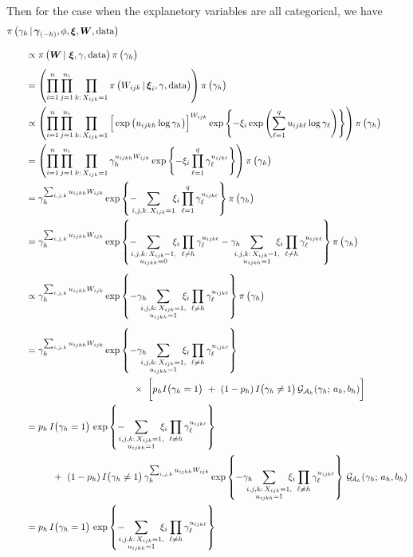 \documentclass[11pt]{article}
\renewcommand{\vec}{\boldsymbol}
\newcommand{\barS}{\,|\,}
\newcommand{\ind}{I}
\newcommand{\gammaExpr}{ -\hspace{3mm} \sum_{\mathclap{i,j,k{:}\, X_{ijk}=1}} \hspace{4mm} \xi_i \prod_{\ell=1}^q \gamma_\ell^{ u_{ijk\ell} } }
\newcommand{\gammaExprUisZero}{ \hspace{3mm} \sum_{\mathclap{\substack{i,j,k{:}\, X_{ijk}=1, \\ u_{ijkh} = 0}}} \hspace{4mm} \xi_i \prod_{\ell \ne h} \gamma_\ell^{ u_{ijk\ell} } }
\newcommand{\gammaExprUisOne}{ \hspace{3mm} \sum_{\mathclap{\substack{i,j,k{:}\, X_{ijk}=1, \\ u_{ijkh} = 1}}} \hspace{4mm} \xi_i \prod_{\ell \ne h} \gamma_\ell^{ u_{ijk\ell} } }
\begin{document}
\begin{enumerate}[label=Step \arabic*., leftmargin=13mm, itemsep=10mm]
Then for the case when the explanetory variables are all categorical, we have
\begin{align*} \MoveEqLeft
\pi\, \big( \gamma_h \barS \vec{\gamma}_{(-h)}, \phi, \vec{\xi}, \vec{W}, \text{data} \big) \\[2ex]
& \propto \pi\, \big( \vec{W} \barS\, \vec{\xi}, \gamma, \text{data} \big)\, \pi\,\big( \gamma_h \big) \\[1ex]
&= \left( \prod_{i=1}^{n} \prod_{j=1}^{n_i} \prod_{k{:}\, X_{ijk} = 1} \pi\, \big( W_{ijk} \barS \vec{\xi}_i, \gamma, \text{data} \big) \right) \pi\, \big( \gamma_h \big) \\
&\propto \left( \prod_{i=1}^{n} \prod_{j=1}^{n_i} \prod_{k{:}\, X_{ijk} = 1} \Big[ \exp\big( u_{ijkh} \log \gamma_h \big) \Big]^{W_{ijk}} \exp\left\{ -\xi_i \exp\left( \sum_{\ell=1}^q u_{ijk\ell} \log \gamma_{\ell} \right) \right\} \right) \pi\, \big( \gamma_h \big) \\
&= \left( \prod_{i=1}^{n} \prod_{j=1}^{n_i} \prod_{k{:}\, X_{ijk} = 1} \gamma_h^{ u_{ijkh} W_{ijk} } \exp\left\{ -\xi_i \prod_{\ell=1}^q \gamma_\ell^{ u_{ijk\ell} } \right\} \right) \pi\, \big( \gamma_h \big) \\
&= \gamma_h^{ \sum_{i,j,k} u_{ijkh} W_{ijk} } \exp\left\{ \gammaExpr \right\} \pi\, \big( \gamma_h \big) \\
&= \gamma_h^{ \sum_{i,j,k} u_{ijkh} W_{ijk} } \exp\left\{ - \gammaExprUisZero - \gamma_h\gammaExprUisOne \right\} \pi\, \big( \gamma_h \big) \\[1ex]
&\propto \gamma_h^{ \sum_{i,j,k} u_{ijkh} W_{ijk} } \exp\left\{- \gamma_h\gammaExprUisOne \right\} \pi\, \big( \gamma_h \big) \\[1ex]
&= \gamma_h^{ \sum_{i,j,k} u_{ijkh} W_{ijk} } \exp\left\{- \gamma_h\gammaExprUisOne \right\} \\
& \hspace{40mm} \times~ \bigg[ p_h \ind\big( \gamma_h = 1 \big) ~+~ (1 - p_h)\, \ind\big( \gamma_h \ne 1 \big)\, \mathcal{G}_{\mathcal{A}_h} (\gamma_h;\, a_h,b_h) \bigg] \\
&= p_h\, \ind\big( \gamma_h = 1 \big)\, \exp\left\{ -\gammaExprUisOne \right\} \\
& \hspace{10mm} +~ (1 - p_h)\, \ind\big(\gamma_h \ne 1 \big)\, \gamma_h^{ \sum_{i,j,k} u_{ijkh} W_{ijk} } \exp\left\{ -\gamma_h\gammaExprUisOne \right\} \, \mathcal{G}_{\!\mathcal{A}_h} (\gamma_h;\, a_h,b_h) \\
&= p_h\, \ind\big( \gamma_h = 1 \big)\, \exp\left\{ -\gammaExprUisOne \right\} \\[1ex]

\end{align*}
\end{enumerate}
\end{document}
